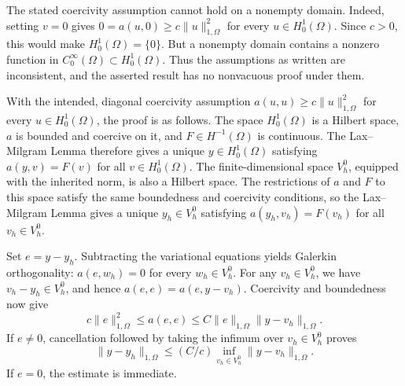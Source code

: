 \documentclass{article}
\begin{document}
The stated coercivity assumption cannot hold on a nonempty domain. Indeed, setting \(v=0\) gives \(0=a(u,0)\geq c\|u\|_{1,\Omega}^{2}\) for every \(u\in H^1_0(\Omega)\). Since \(c>0\), this would make \(H^1_0(\Omega)=\{0\}\). But a nonempty domain contains a nonzero function in \(C^\infty_0(\Omega)\subset H^1_0(\Omega)\). Thus the assumptions as written are inconsistent, and the asserted result has no nonvacuous proof under them.

With the intended, diagonal coercivity assumption \(a(u,u)\geq c\|u\|_{1,\Omega}^{2}\) for every \(u\in H^1_0(\Omega)\), the proof is as follows. The space \(H^1_0(\Omega)\) is a Hilbert space, \(a\) is bounded and coercive on it, and \(F\in H^{-1}(\Omega)\) is continuous. The Lax--Milgram Lemma therefore gives a unique \(y\in H^1_0(\Omega)\) satisfying \(a(y,v)=F(v)\) for all \(v\in H^1_0(\Omega)\). The finite-dimensional space \(V_h^0\), equipped with the inherited norm, is also a Hilbert space. The restrictions of \(a\) and \(F\) to this space satisfy the same boundedness and coercivity conditions, so the Lax--Milgram Lemma gives a unique \(y_h\in V_h^0\) satisfying \(a(y_h,v_h)=F(v_h)\) for all \(v_h\in V_h^0\).

Set \(e=y-y_h\). Subtracting the variational equations yields Galerkin orthogonality: \(a(e,w_h)=0\) for every \(w_h\in V_h^0\). For any \(v_h\in V_h^0\), we have \(v_h-y_h\in V_h^0\), and hence \(a(e,e)=a(e,y-v_h)\). Coercivity and boundedness now give
\[
c\|e\|_{1,\Omega}^{2}\leq a(e,e)\leq C\|e\|_{1,\Omega}\|y-v_h\|_{1,\Omega}.
\]
If \(e\neq0\), cancellation followed by taking the infimum over \(v_h\in V_h^0\) proves
\[
\|y-y_h\|_{1,\Omega}\leq (C/c)\inf_{v_h\in V_h^0}\|y-v_h\|_{1,\Omega}.
\]
If \(e=0\), the estimate is immediate.
\end{document}
